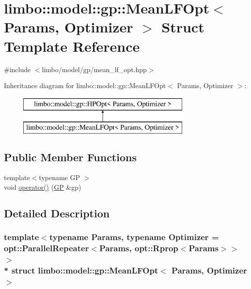 \hypertarget{structlimbo_1_1model_1_1gp_1_1_mean_l_f_opt}{}\section{limbo\+:\+:model\+:\+:gp\+:\+:Mean\+L\+F\+Opt$<$ Params, Optimizer $>$ Struct Template Reference}
\label{structlimbo_1_1model_1_1gp_1_1_mean_l_f_opt}


{\ttfamily \#include $<$limbo/model/gp/mean\+\_\+lf\+\_\+opt.\+hpp$>$}

Inheritance diagram for limbo\+:\+:model\+:\+:gp\+:\+:Mean\+L\+F\+Opt$<$ Params, Optimizer $>$\+:\begin{figure}[H]
\begin{center}
\leavevmode
\includegraphics[height=2.000000cm]{structlimbo_1_1model_1_1gp_1_1_mean_l_f_opt}
\end{center}
\end{figure}
\subsection*{Public Member Functions}
\begin{DoxyCompactItemize}
\item 
{\footnotesize template$<$typename GP $>$ }\\void \hyperlink{structlimbo_1_1model_1_1gp_1_1_mean_l_f_opt_a3db7aa510b906aeacc851f984ceac1ca}{operator()} (\hyperlink{classlimbo_1_1model_1_1_g_p}{GP} \&gp)
\end{DoxyCompactItemize}


\subsection{Detailed Description}
\subsubsection*{template$<$typename Params, typename Optimizer = opt\+::\+Parallel\+Repeater$<$\+Params, opt\+::\+Rprop$<$\+Params$>$$>$$>$\\*
struct limbo\+::model\+::gp\+::\+Mean\+L\+F\+Opt$<$ Params, Optimizer $>$}

